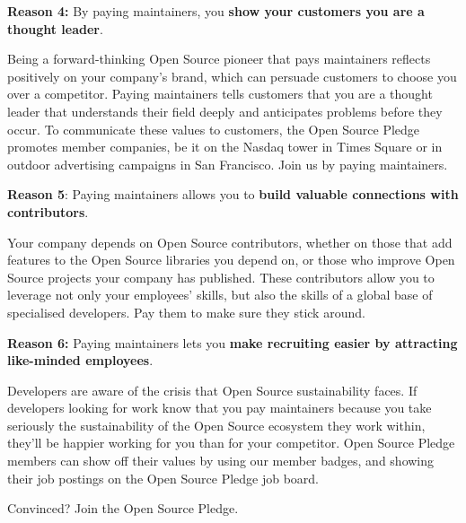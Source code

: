 \begin{multicols}{2}
\textbf{Reason 4:} By paying maintainers, you \textbf{show your customers you are a thought leader}.

Being a forward-thinking Open Source pioneer that pays maintainers reflects positively on your company's brand, which
can persuade customers to choose you over a competitor. Paying maintainers tells customers that you are a thought leader
that understands their field deeply and anticipates problems before they occur. To communicate these values to
customers, the Open Source Pledge promotes member companies, be it on the Nasdaq tower in Times Square or in outdoor
advertising campaigns in San Francisco. Join us by paying maintainers.

\textbf{Reason 5}: Paying maintainers allows you to \textbf{build valuable connections with contributors}.

Your company depends on Open Source contributors, whether on those that add features to the Open Source libraries you
depend on, or those who improve Open Source projects your company has published. These contributors allow you to
leverage not only your employees' skills, but also the skills of a global base of specialised developers. Pay them to
make sure they stick around.

\textbf{Reason 6:} Paying maintainers lets you \textbf{make recruiting easier by attracting like-minded employees}.

Developers are aware of the crisis that Open Source sustainability faces. If developers looking for work know that you
pay maintainers because you take seriously the sustainability of the Open Source ecosystem they work within, they'll be
happier working for you than for your competitor. Open Source Pledge members can show off their values by using our
member badges, and showing their job postings on the Open Source Pledge job board.

Convinced? Join the Open Source Pledge.

\end{multicols}


